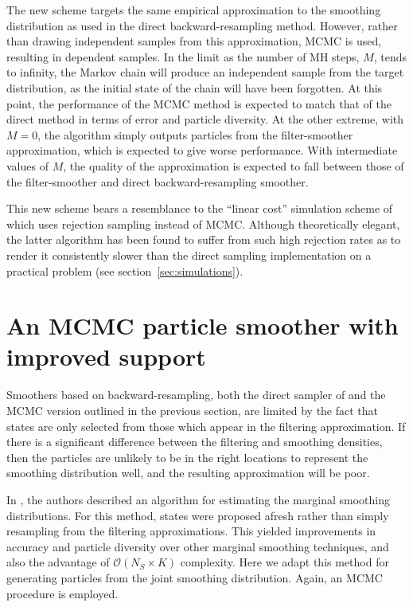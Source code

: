 \documentclass[10pt,twocolumn,twoside]{IEEEtran}
\begin{document}
The new scheme targets the same empirical approximation to the smoothing distribution as used in the direct backward-resampling method. However, rather than drawing independent samples from this approximation, MCMC is used, resulting in dependent samples.  In the limit as the number of MH steps, $M$, tends to infinity, the Markov chain will produce an independent sample from the target distribution, as the initial state of the chain will have been forgotten. At this point, the performance of the MCMC method is expected to match that of the direct method in terms of error and particle diversity. At the other extreme, with $M=0$, the algorithm simply outputs particles from the filter-smoother approximation, which is expected to give worse performance. With intermediate values of $M$, the quality of the approximation is expected to fall between those of the filter-smoother and direct backward-resampling smoother.

This new scheme bears a resemblance to the ``linear cost'' simulation scheme of \cite{Douc2009} which uses rejection sampling instead of MCMC. Although theoretically elegant, the latter algorithm has been found to suffer from such high rejection rates as to render it consistently slower than the direct sampling implementation on a practical problem (see section~\ref{sec:simulations}).



\section{An MCMC particle smoother with improved support} \label{sec:new_state_smoother}

Smoothers based on backward-resampling, both the direct sampler of \cite{Godsill2004} and the MCMC version outlined in the previous section, are limited by the fact that states are only selected from those which appear in the filtering approximation. If there is a significant difference between the filtering and smoothing densities, then the particles are unlikely to be in the right locations to represent the smoothing distribution well, and the resulting approximation will be poor.

In \cite{Fearnhead2010}, the authors described an algorithm for estimating the marginal smoothing distributions. For this method, states were proposed afresh rather than simply resampling from the filtering approximations. This yielded improvements in accuracy and particle diversity over other marginal smoothing techniques, and also the advantage of $\mathcal{O}(N_S \times K)$ complexity. Here we adapt this method for generating particles from the joint smoothing distribution. Again, an MCMC procedure is employed.
\end{document}

